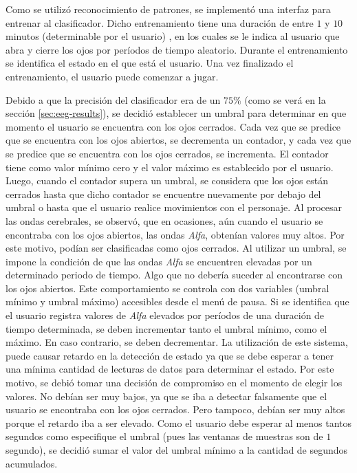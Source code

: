 Como se utilizó reconocimiento de patrones, se implementó una interfaz para entrenar al clasificador. Dicho entrenamiento tiene una duración de entre $1$ y $10$ minutos (determinable por el usuario) , en los cuales se le indica al usuario que abra y cierre los ojos por períodos de tiempo aleatorio. Durante el entrenamiento se identifica el estado en el que está el usuario. Una vez finalizado el entrenamiento, el usuario puede comenzar a jugar.

Debido a que la precisión del clasificador era de un  $75\%$ (como se verá en la sección \ref{sec:eeg-results}), se decidió establecer un umbral para determinar en que momento el usuario se encuentra con los ojos cerrados. Cada vez que se predice que se encuentra con los ojos abiertos, se decrementa un contador, y cada vez que se predice que se encuentra con los ojos cerrados, se incrementa. El contador tiene como valor mínimo cero y el valor máximo es establecido por el usuario.  Luego, cuando el contador supera un umbral, se considera que los ojos están cerrados hasta que dicho contador se encuentre nuevamente por debajo del umbral o hasta que el usuario realice movimientos con el personaje. Al procesar las ondas cerebrales, se observó, que en ocasiones, aún cuando el usuario se encontraba con los ojos abiertos, las ondas \emph{Alfa}, obtenían valores muy altos. Por este motivo, podían ser clasificadas como ojos cerrados. Al utilizar un umbral, se impone la condición de que las ondas  \emph{Alfa} se encuentren elevadas por un determinado periodo de tiempo. Algo que no debería suceder al encontrarse con los ojos abiertos. Este comportamiento se controla con dos variables (umbral mínimo y umbral máximo) accesibles desde el menú de pausa. Si se identifica que el usuario registra valores de \emph{Alfa} elevados por períodos de una duración de tiempo determinada, se deben incrementar  tanto el umbral mínimo, como el máximo. En caso contrario, se deben decrementar. La utilización de este sistema, puede causar retardo en la detección de estado ya que se debe esperar a tener una mínima cantidad de lecturas de datos para determinar el estado. Por este motivo, se debió tomar una decisión de compromiso en el momento de elegir los valores. No debían ser muy bajos, ya que se iba a detectar falsamente que el usuario se encontraba con los ojos cerrados. Pero tampoco, debían ser muy altos porque el retardo iba a ser elevado. Como el usuario debe esperar al menos tantos segundos como especifique el umbral (pues las ventanas de muestras son de $1$ segundo), se decidió sumar el valor del umbral mínimo a la cantidad de segundos acumulados.

